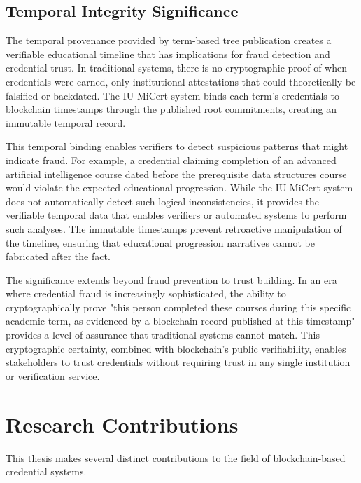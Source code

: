 \subsection{Temporal Integrity Significance}
\label{subsec:temporal-implications}

The temporal provenance provided by term-based tree publication creates a verifiable educational timeline that has implications for fraud detection and credential trust. In traditional systems, there is no cryptographic proof of when credentials were earned, only institutional attestations that could theoretically be falsified or backdated. The IU-MiCert system binds each term's credentials to blockchain timestamps through the published root commitments, creating an immutable temporal record.

This temporal binding enables verifiers to detect suspicious patterns that might indicate fraud. For example, a credential claiming completion of an advanced artificial intelligence course dated before the prerequisite data structures course would violate the expected educational progression. While the IU-MiCert system does not automatically detect such logical inconsistencies, it provides the verifiable temporal data that enables verifiers or automated systems to perform such analyses. The immutable timestamps prevent retroactive manipulation of the timeline, ensuring that educational progression narratives cannot be fabricated after the fact.

The significance extends beyond fraud prevention to trust building. In an era where credential fraud is increasingly sophisticated, the ability to cryptographically prove "this person completed these courses during this specific academic term, as evidenced by a blockchain record published at this timestamp" provides a level of assurance that traditional systems cannot match. This cryptographic certainty, combined with blockchain's public verifiability, enables stakeholders to trust credentials without requiring trust in any single institution or verification service.

\section{Research Contributions}
\label{sec:contributions}

This thesis makes several distinct contributions to the field of blockchain-based credential systems.

